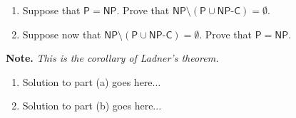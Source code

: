 \documentclass{article}
\begin{document}
\begin{question}
\begin{enumerate}[label = (\alph*)]
    \item Suppose that $\mathsf P = \mathsf{NP}$. Prove that $\mathsf{NP} \setminus \left(\mathsf P \cup \mathsf{NP\text{-}C}\right) = \emptyset$.

    \item Suppose now that $\mathsf{NP} \setminus \left(\mathsf P \cup \mathsf{NP\text{-}C}\right) = \emptyset$. Prove that $\mathsf P = \mathsf{NP}$.
\end{enumerate}

{\bfseries Note.} {\em This is the corollary of Ladner's theorem.}
\end{question}

\begin{solution}
\begin{enumerate}[label = (\alph*)]
    \item Solution to part (a) goes here...

    \item Solution to part (b) goes here...
\end{enumerate}
\end{solution}
\end{document}
